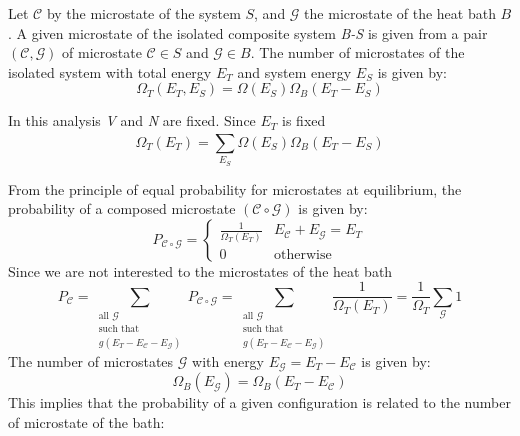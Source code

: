 \documentclass[../../Main/Main.tex]{subfiles}
\begin{document}
Let \( \mathcal{C}  \) by the microstate of the system \( S \), and \( \mathcal{G}  \) the microstate of the heat bath \( B \).
A given microstate of the isolated composite system \emph{B-S} is given from a pair \( (\mathcal{C},\mathcal{G}  ) \) of microstate \( \mathcal{C} \in S  \) and   \( \mathcal{G} \in B  \).
The number of microstates of the isolated system with total energy \( E_T \) and system energy \( E_S \)  is given by:
\begin{equation*}
  \Omega _T (E_T,E_S) = \Omega (E_S) \Omega _B (E_T - E_S)
\end{equation*}
\begin{remark}
In this analysis \emph{V} and \emph{N} are fixed. Since \( E_T \) is fixed
\begin{equation}
  \Omega _T (E_T) = \sum_{E_S}^{} \Omega (E_S) \Omega _B (E_T - E_S)
\end{equation}
\end{remark}
From the principle of equal probability for microstates at equilibrium, the probability of a composed microstate \( (\mathcal{C} \circ \mathcal{G}  ) \) is given by:
\begin{equation}
P_{\mathcal{C} \circ \mathcal{G}} =
  \begin{cases}
   \frac{1}{\Omega _T (E_T)} & E_{\mathcal{C} } + E_{\mathcal{G} } = E_T \\
  0 & \text{otherwise}
  \end{cases}
\end{equation}
Since we are not interested to the microstates of the heat bath
\begin{equation}
  P_{\mathcal{C} } = \sum_{\substack{ \text{all } \mathcal{G}  \\  \text{such that}  \\ g (E_T -E_{\mathcal{C} } - E_{\mathcal{G} }) } }^{} P_{\mathcal{C} \circ \mathcal{G}}   = 
  \sum_{\substack{ \text{all } \mathcal{G}  \\  \text{such that}  \\ g (E_T -E_{\mathcal{C} } - E_{\mathcal{G} }) } }^{} \frac{1}{\Omega _T (E_T)} = \frac{1}{\Omega _T} \sum_{\mathcal{G} }^{}   1
\end{equation}
The number of microstates \( \mathcal{G}  \) with energy \( E_{\mathcal{G} }= E_T - E_{\mathcal{C} } \) is given by:
\begin{equation*}
  \Omega _B (E_{\mathcal{G} }) = \Omega_B (E_T - E_{\mathcal{C} })
\end{equation*}
This implies that the probability of a given configuration is related to the number of microstate of the bath:
\end{document}
